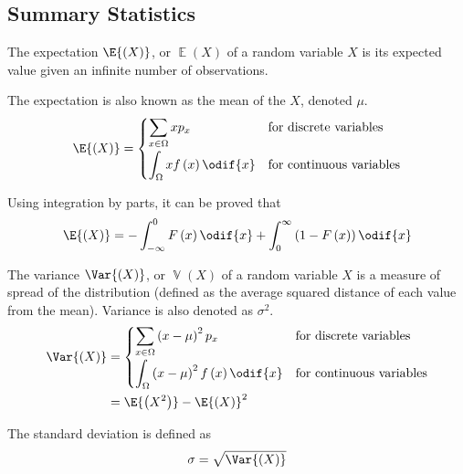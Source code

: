 \documentclass{article}
\begin{document}
\subsection{Summary Statistics}
\begin{definition}[Expectation]
    The expectation \(\E{\left( X \right)}\), or \(\operatorname{\mathbb{E}}{\left( X \right)}\)
    of a random variable \(X\) is its expected value given an
    infinite number of observations.

    The expectation is also known as the mean of the \(X\), denoted \(\mu\).
    \begin{equation*}
        \E{\left( X \right)} =
        \begin{cases}
            \displaystyle \sum_{x \in \Omega} x p_x                & \text{for discrete variables}   \\[0.4cm]
            \displaystyle \int_\Omega x f\left( x \right) \odif{x} & \text{for continuous variables}
        \end{cases}
    \end{equation*}
\end{definition}
\begin{theorem}
    Using integration by parts, it can be proved that
    \begin{equation*}
        \E{\left(X\right)} = -\int_{-\infty}^0 F\left( x \right) \odif{x} + \int_0^\infty \left(1 - F\left( x \right)\right) \odif{x}
    \end{equation*}
\end{theorem}
\begin{definition}[Variance]
    The variance \(\Var{\left( X \right)}\), or \(\operatorname{\mathbb{V}}{\left( X \right)}\) of a random variable \(X\) is a measure of spread
    of the distribution (defined as the average squared distance of each value from the mean).
    Variance is also denoted as \(\sigma^2\).
    \begin{align*}
        \Var{\left( X \right)} & =
        \begin{cases}
            \displaystyle \sum_{x \in \Omega} \left( x - \mu \right)^2 p_x                  & \text{for discrete variables}   \\[0.4cm]
            \displaystyle \int_{\Omega} \left( x - \mu \right)^2 f\left( x \right) \odif{x} & \text{for continuous variables}
        \end{cases} \\
                               & = \E{\left( X^2 \right)} - \E{\left( X \right)}^2
    \end{align*}
\end{definition}
\begin{definition}
    The standard deviation is defined as
    \begin{equation*}
        \sigma = \sqrt{\Var{\left( X \right)}}
    \end{equation*}
\end{definition}
\end{document}
